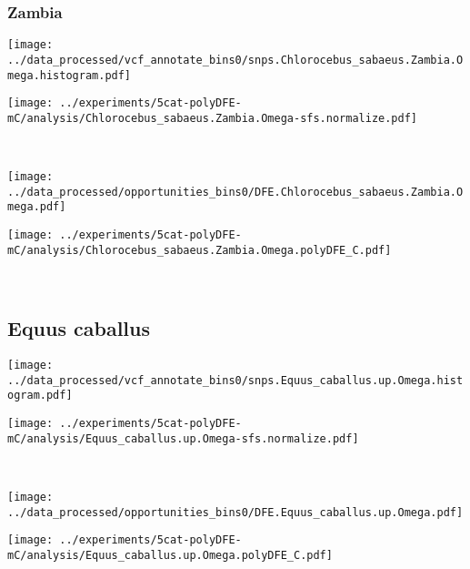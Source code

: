 \subsubsection{Zambia}

\begin{minipage}{0.49\linewidth}
    \texttt{[image: ../data\_processed/vcf\_annotate\_bins0/snps.Chlorocebus\_sabaeus.Zambia.Omega.histogram.pdf]}
\end{minipage}
\begin{minipage}{0.49\linewidth}
    \texttt{[image: ../experiments/5cat-polyDFE-mC/analysis/Chlorocebus\_sabaeus.Zambia.Omega-sfs.normalize.pdf]}
\end{minipage}
\\
\begin{minipage}{0.49\linewidth}
    \texttt{[image: ../data\_processed/opportunities\_bins0/DFE.Chlorocebus\_sabaeus.Zambia.Omega.pdf]}
\end{minipage}
\begin{minipage}{0.49\linewidth}
    \texttt{[image: ../experiments/5cat-polyDFE-mC/analysis/Chlorocebus\_sabaeus.Zambia.Omega.polyDFE\_C.pdf]}
\end{minipage}
\\

\subsection{Equus caballus}

\begin{minipage}{0.49\linewidth}
    \texttt{[image: ../data\_processed/vcf\_annotate\_bins0/snps.Equus\_caballus.up.Omega.histogram.pdf]}
\end{minipage}
\begin{minipage}{0.49\linewidth}
    \texttt{[image: ../experiments/5cat-polyDFE-mC/analysis/Equus\_caballus.up.Omega-sfs.normalize.pdf]}
\end{minipage}
\\
\begin{minipage}{0.49\linewidth}
    \texttt{[image: ../data\_processed/opportunities\_bins0/DFE.Equus\_caballus.up.Omega.pdf]}
\end{minipage}
\begin{minipage}{0.49\linewidth}
    \texttt{[image: ../experiments/5cat-polyDFE-mC/analysis/Equus\_caballus.up.Omega.polyDFE\_C.pdf]}
\end{minipage}
\\

